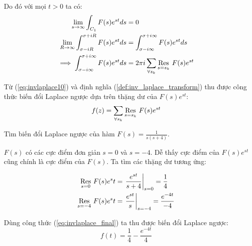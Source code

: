 Do đó với mọi \(t>0\) ta có:
\begin{align}
	\label{eq:invlaplace10}
	\lim_{s \to \infty} \int_{C_1} F(s)e^{st}ds &= 0\nonumber\\
	\lim_{R \to \infty} \int_{\sigma-iR}^{\sigma+iR} F(s)e^{st}ds &= \int_{\sigma-i\infty}^{\sigma+i\infty} F(s)e^{st}ds\nonumber\\
	\implies \int_{\sigma-i\infty}^{\sigma+i\infty} F(s)e^{st}ds &= 2\pi i \sum^{\vphantom{n}}_{\forall s_k}\Res{F(s)e^{st}}{s=s_k}
\end{align}

Từ (\ref{eq:invlaplace10}) và định nghĩa (\ref{def:inv_laplace_transform}) thu được công thức biến đổi Laplace ngược dựa trên thặng dư của $F(s)e^{st}$:
\begin{equation}
	\label{eq:invlaplace_final}
	f(z) = \sum_{\forall s_k}\Res{F(s)e^{st}}{s=s_k}
\end{equation}

\begin{example}
	Tìm biến đổi Laplace ngược của hàm $F(s) = \frac{1}{s(s+4)}$.\par
	$F(s)$ có các cực điểm đơn giản $s = 0$ và $s = -4$. Dễ thấy cực điểm của $F(s)e^{st}$ cũng chính là cực điểm của $F(s)$. Ta tìm các thặng dư tương ứng:\par
	\begin{align*}
		\Res{F(s)e^st}{s=0} &= \left.\frac{e^{st}}{s+4}\right\rvert_{s=0} = \frac{1}{4}\\
		\Res{F(s)e^st}{s=-4} &= \left.\frac{e^{st}}{s}\right\rvert_{s=-4} = \frac{e^{-4t}}{-4}
	\end{align*}\par
	Dùng công thức (\ref{eq:invlaplace_final}) ta thu được biến đổi Laplace ngược:
	\begin{equation}
		f(t) = \frac 1 4 - \frac{e^{-4t}} 4
	\end{equation}
\end{example}


